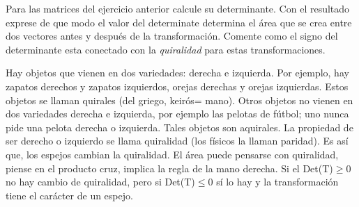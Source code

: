 \begin{exercise}
 \item
 Para las matrices del ejercicio anterior calcule su determinante. Con el resultado exprese de que modo el valor del determinate determina el área que se crea entre dos vectores antes y después de la transformación. Comente como el signo del determinante esta conectado con la \textit{quiralidad} para estas transformaciones.

\bigskip

 Hay objetos que vienen en dos variedades: derecha e izquierda. Por ejemplo, hay zapatos derechos y zapatos izquierdos, orejas derechas y orejas izquierdas. Estos objetos se llaman quirales (del griego, keirós= mano). Otros objetos no vienen en dos variedades derecha e izquierda, por ejemplo las pelotas de fútbol; uno nunca pide una pelota derecha o izquierda. Tales objetos son aquirales. La propiedad de ser derecho o izquierdo se llama quiralidad (los físicos la llaman paridad). Es así que, los espejos cambian la quiralidad. El área puede pensarse con quiralidad, piense en el producto cruz, implica la regla de la mano derecha.
 Si el Det(T)$\geq0$ no hay cambio de quiralidad, pero si Det(T)$\leq 0$ sí lo hay y la transformación tiene  el carácter de un espejo.\\
\end{exercise}
